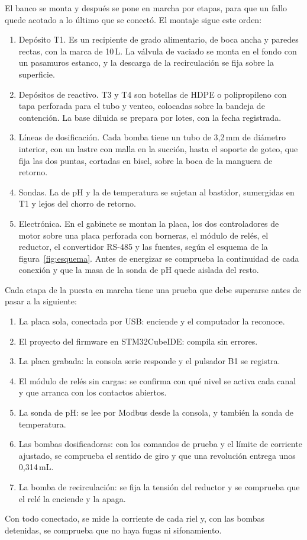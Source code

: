 El banco se monta y después se pone en marcha por etapas, para que un fallo quede acotado a lo último que se conectó. El montaje sigue este orden:
\begin{enumerate}
\item Depósito T1. Es un recipiente de grado alimentario, de boca ancha y paredes rectas, con la marca de 10\,L. La válvula de vaciado se monta en el fondo con un pasamuros estanco, y la descarga de la recirculación se fija sobre la superficie.
\item Depósitos de reactivo. T3 y T4 son botellas de HDPE o polipropileno con tapa perforada para el tubo y venteo, colocadas sobre la bandeja de contención. La base diluida se prepara por lotes, con la fecha registrada.
\item Líneas de dosificación. Cada bomba tiene un tubo de 3,2\,mm de diámetro interior, con un lastre con malla en la succión, hasta el soporte de goteo, que fija las dos puntas, cortadas en bisel, sobre la boca de la manguera de retorno.
\item Sondas. La de pH y la de temperatura se sujetan al bastidor, sumergidas en T1 y lejos del chorro de retorno.
\item Electrónica. En el gabinete se montan la placa, los dos controladores de motor sobre una placa perforada con borneras, el módulo de relés, el reductor, el convertidor RS-485 y las fuentes, según el esquema de la figura~\ref{fig:esquema}. Antes de energizar se comprueba la continuidad de cada conexión y que la masa de la sonda de pH quede aislada del resto.
\end{enumerate}
Cada etapa de la puesta en marcha tiene una prueba que debe superarse antes de pasar a la siguiente:
\begin{enumerate}
\item La placa sola, conectada por USB: enciende y el computador la reconoce.
\item El proyecto del firmware en STM32CubeIDE: compila sin errores.
\item La placa grabada: la consola serie responde y el pulsador B1 se registra.
\item El módulo de relés sin cargas: se confirma con qué nivel se activa cada canal y que arranca con los contactos abiertos.
\item La sonda de pH: se lee por Modbus desde la consola, y también la sonda de temperatura.
\item Las bombas dosificadoras: con los comandos de prueba y el límite de corriente ajustado, se comprueba el sentido de giro y que una revolución entrega unos 0,314\,mL.
\item La bomba de recirculación: se fija la tensión del reductor y se comprueba que el relé la enciende y la apaga.
\end{enumerate}
Con todo conectado, se mide la corriente de cada riel y, con las bombas detenidas, se comprueba que no haya fugas ni sifonamiento.


